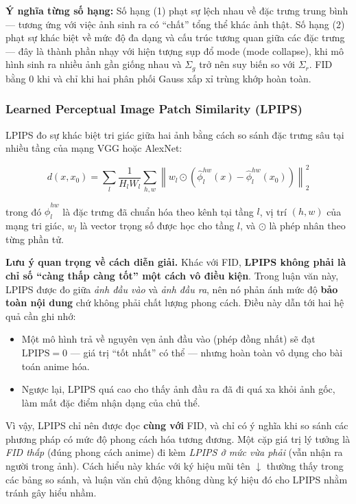 \textbf{Ý nghĩa từng số hạng:} Số hạng (1) phạt sự lệch nhau về đặc trưng trung bình --- tương ứng với việc ảnh sinh ra có ``chất'' tổng thể khác ảnh thật. Số hạng (2) phạt sự khác biệt về mức độ đa dạng và cấu trúc tương quan giữa các đặc trưng --- đây là thành phần nhạy với hiện tượng sụp đổ mode (mode collapse), khi mô hình sinh ra nhiều ảnh gần giống nhau và $\Sigma_g$ trở nên suy biến so với $\Sigma_r$. FID bằng 0 khi và chỉ khi hai phân phối Gauss xấp xỉ trùng khớp hoàn toàn.

\subsubsection{Learned Perceptual Image Patch Similarity (LPIPS)}

LPIPS \cite{Zhang2018LPIPS} đo sự khác biệt tri giác giữa hai ảnh bằng cách so sánh đặc trưng sâu tại nhiều tầng của mạng VGG hoặc AlexNet:

\begin{equation}
\label{eq:lpips}
d(x, x_0) = \sum_{l} \frac{1}{H_l W_l} \sum_{h,w} \left\| w_l \odot \left( \hat{\phi}_l^{hw}(x) - \hat{\phi}_l^{hw}(x_0) \right) \right\|_2^2
\end{equation}

\noindent trong đó $\hat{\phi}_l^{hw}$ là đặc trưng đã chuẩn hóa theo kênh tại tầng $l$, vị trí $(h, w)$ của mạng tri giác, $w_l$ là vector trọng số được học cho tầng $l$, và $\odot$ là phép nhân theo từng phần tử.

\textbf{Lưu ý quan trọng về cách diễn giải.} Khác với FID, \textbf{LPIPS không phải là chỉ số ``càng thấp càng tốt'' một cách vô điều kiện}. Trong luận văn này, LPIPS được đo giữa \textit{ảnh đầu vào} và \textit{ảnh đầu ra}, nên nó phản ánh mức độ \textbf{bảo toàn nội dung} chứ không phải chất lượng phong cách. Điều này dẫn tới hai hệ quả cần ghi nhớ:

\begin{itemize}
    \item Một mô hình trả về nguyên vẹn ảnh đầu vào (phép đồng nhất) sẽ đạt $\text{LPIPS} = 0$ --- giá trị ``tốt nhất'' có thể --- nhưng hoàn toàn vô dụng cho bài toán anime hóa.
    \item Ngược lại, LPIPS quá cao cho thấy ảnh đầu ra đã đi quá xa khỏi ảnh gốc, làm mất đặc điểm nhận dạng của chủ thể.
\end{itemize}

Vì vậy, LPIPS chỉ nên được đọc \textbf{cùng với} FID, và chỉ có ý nghĩa khi so sánh các phương pháp có mức độ phong cách hóa tương đương. Một cặp giá trị lý tưởng là \textit{FID thấp} (đúng phong cách anime) đi kèm \textit{LPIPS ở mức vừa phải} (vẫn nhận ra người trong ảnh). Cách hiểu này khác với ký hiệu mũi tên $\downarrow$ thường thấy trong các bảng so sánh, và luận văn chủ động không dùng ký hiệu đó cho LPIPS nhằm tránh gây hiểu nhầm.

